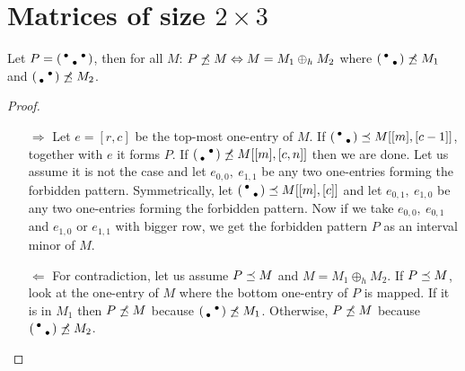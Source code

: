 \section{Matrices of size $2\times3$}
\label{sec2by3}

\begin{thm}
Let $P=\left(\begin{smallmatrix}\bullet& &\bullet\\ &\bullet& \end{smallmatrix}\right)$, then for all $M$: $P\not\preceq M\Leftrightarrow M=M_1\oplus_hM_2$ where $\left(\begin{smallmatrix}\bullet& \\ &\bullet\end{smallmatrix}\right)\not\preceq M_1$ and $\left(\begin{smallmatrix} &\bullet\\\bullet& \end{smallmatrix}\right)\not\preceq M_2$.
\end{thm}
\begin{proof}
\begin{itemize}
\item[$\Rightarrow$] Let $e=[r,c]$ be the top-most one-entry of $M$. If $\left(\begin{smallmatrix}\bullet& \\ &\bullet\end{smallmatrix}\right)\preceq M[[m],[c-1]]$, together with $e$ it forms $P$. If $\left(\begin{smallmatrix} &\bullet\\\bullet& \end{smallmatrix}\right)\not\preceq M[[m],[c,n]]$ then we are done. Let us assume it is not the case and let $e_{0,0},\ e_{1,1}$ be any two one-entries forming the forbidden pattern. Symmetrically, let $\left(\begin{smallmatrix}\bullet& \\ &\bullet\end{smallmatrix}\right)\preceq M[[m],[c]]$ and let $e_{0,1},\ e_{1,0}$ be any two one-entries forming the forbidden pattern. Now if we take $e_{0,0},\ e_{0,1}$ and $e_{1,0}$ or $e_{1,1}$ with bigger row, we get the forbidden pattern $P$ as an interval minor of $M$. 
\item[$\Leftarrow$] For contradiction, let us assume $P\preceq M$ and $M=M_1\oplus_hM_2$. If $P\preceq M$, look at the one-entry of $M$ where the bottom one-entry of $P$ is mapped. If it is in $M_1$ then $P\not\preceq M$ because $\left(\begin{smallmatrix} &\bullet\\\bullet& \end{smallmatrix}\right)\not\preceq M_1$. Otherwise, $P\not\preceq M$ because $\left(\begin{smallmatrix}\bullet& \\ &\bullet\end{smallmatrix}\right)\not\preceq M_2$.
\end{itemize}
\end{proof}

